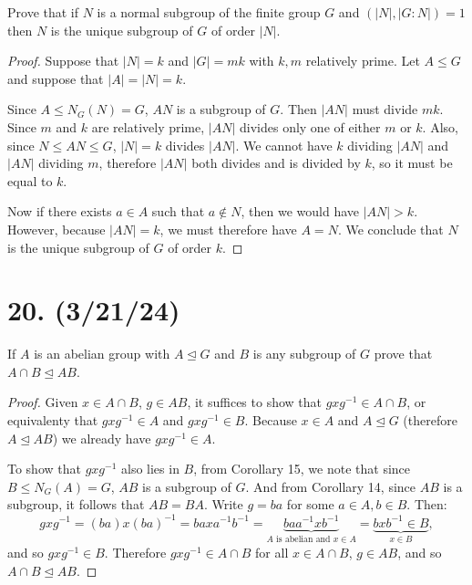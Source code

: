 \documentclass{article}
\begin{document}
Prove that if $N$ is a normal subgroup of the finite group $G$ and $(|N|, |G:N|) = 1$ then $N$ is the unique subgroup of $G$ of order $|N|$.

\begin{proof}
    Suppose that $|N| = k$ and $|G| = mk$ with $k, m$ relatively prime. Let $A \leq G$ and suppose that $|A| = |N| = k$.

    Since $A \leq N_G(N) = G$, $AN$ is a subgroup of $G$. Then $|AN|$ must divide $mk$. Since $m$ and $k$ are relatively prime, $|AN|$ divides only one of either $m$ or $k$. Also, since $N \leq AN \leq G$, $|N| = k$ divides $|AN|$. We cannot have $k$ dividing $|AN|$ and $|AN|$ dividing $m$, therefore $|AN|$ both divides and is divided by $k$, so it must be equal to $k$.

    Now if there exists $a \in A$ such that $a \notin N$, then we would have $|AN| > k$. However, because $|AN| = k$, we must therefore have $A = N$. We conclude that $N$ is the unique subgroup of $G$ of order $k$.
\end{proof}

\section*{20. (3/21/24)}

If $A$ is an abelian group with $A \unlhd G$ and $B$ is any subgroup of $G$ prove that $A \cap B \unlhd AB$.

\begin{proof}
    Given $x \in A \cap B$, $g \in AB$, it suffices to show that $gxg^{-1} \in A \cap B$, or equivalenty that $gxg^{-1} \in A$ and $gxg^{-1} \in B$. Because $x \in A$ and $A \unlhd G$ (therefore $A \unlhd AB$) we already have $gxg^{-1} \in A$.

    To show that $gxg^{-1}$ also lies in $B$, from Corollary 15, we note that since $B \leq N_G(A) = G$, $AB$ is a subgroup of $G$. And from Corollary 14, since $AB$ is a subgroup, it follows that $AB = BA$. Write $g = ba$ for some $a \in A, b \in B$. Then:
    \begin{equation*}
        gxg^{-1} = (ba)x(ba)^{-1} = baxa^{-1}b^{-1} = \underbrace{baa^{-1}xb^{-1}}_{A \text{ is abelian and $x \in A$}} = \underbrace{bxb^{-1} \in B}_\text{$x \in B$},
    \end{equation*}
    and so $gxg^{-1} \in B$. Therefore $gxg^{-1} \in A \cap B$ for all $x \in A \cap B$, $g \in AB$, and so $A \cap B \unlhd AB$.
\end{proof}
\end{document}
